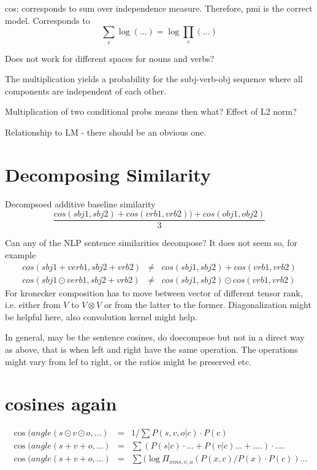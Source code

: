 cos: corresponds to sum over independence measure.
Therefore, pmi is the correct model.
Corresponds to
\[
\sum_c \log(...) = \log \prod_c(...)
\]



Does not work for different
spaces for nouns and verbs?

The multiplication yields a probability
for the subj-verb-obj sequence where all
components are independent of each other.

Multiplication of two conditional probs means then what?
Effect of L2 norm?


Relationship to LM - there should be an obvious one.


\section{Decomposing Similarity}
Decompsoed additive baseline similarity
\[
\frac{cos(sbj1,sbj2) + cos(vrb1,vrb2)) + cos(obj1,obj2)}{3}
\]

Can any of the NLP sentence similarities decompose? It does not seem so, for example
\begin{eqnarray*}
cos(sbj1+verb1,sbj2+vrb2) &\neq& cos(sbj1, sbj2) + cos(vrb1,vrb2) \\
cos(sbj1\odot verb1,sbj2+vrb2) &\neq& cos(sbj1, sbj2) \odot cos(vrb1,vrb2)
\end{eqnarray*}
For kronecker composition has to move between vector of different tensor rank, i.e. either from $V$ to $V \otimes V$ or from the latter to the former. Diagonalization might be helpful here, also convolution kernel might help. 

In general, may be the sentence cosines, do doecompsoe but not in a direct way as above, that is when left and right have the same operation. The operations might vary from lef to right, or the ratios might be preserved etc. 



\section{cosines again}

\begin{eqnarray}
\cos(angle(s\odot v\odot o, ...) &=&  1/ \sum P(s,v,o|c) \cdot P(c)\\
\cos(angle(s+v+o, ...) &=& \sum (P(s|c)  \cdot  ... + P(v|c) ... + ....)  \cdot  ....\\
\cos(angle(s+v+o, ...) &=&  \sum (\log{\Pi_{x in s,v,o} (P(x,c)/P(x) \cdot P(c)) ...}\\
\end{eqnarray}

